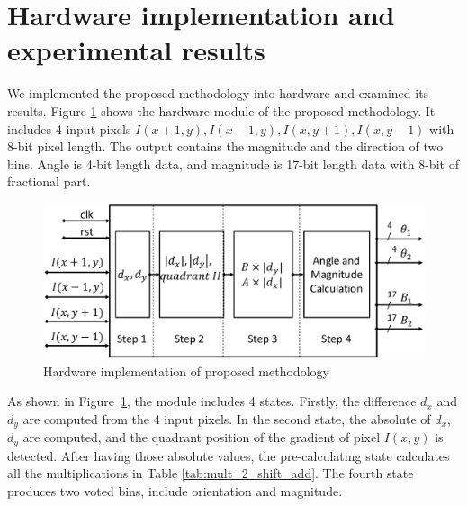 %
%


\section{Hardware implementation and experimental results}
\label{sec:experimental_results}

We implemented the proposed methodology into hardware and examined
its results.
Figure \ref{fig:hw_implementation_002} shows the hardware module of
the proposed methodology.
It includes 4 input pixels $I(x + 1, y), I(x - 1, y), I(x, y + 1), I(x, y - 1)$
with 8-bit pixel length.
The output contains the magnitude and the direction of two bins.
Angle  is 4-bit length data, and magnitude is 17-bit length data with
8-bit of fractional part.

\begin{figure}[h]
	\centering
	\def\sscale{1\linewidth}
	\includegraphics[width=\sscale]{"imgs/hw_implementation"}
	\caption{Hardware implementation of proposed methodology}
	\label{fig:hw_implementation_002}
\end{figure}



As shown in Figure~\ref{fig:hw_implementation_002}, the module includes 4
states.
Firstly, the difference $d_x$ and $d_y$ are computed from the 4 input
pixels.
In the second state, the absolute of $d_x$, $d_y$ are computed, and the quadrant
position of the gradient of pixel $I(x,y)$ is  detected.
After having those absolute values, the pre-calculating state calculates
all the multiplications in Table \ref{tab:mult_2_shift_add}.
The fourth state produces two voted bins, include  orientation and magnitude.

